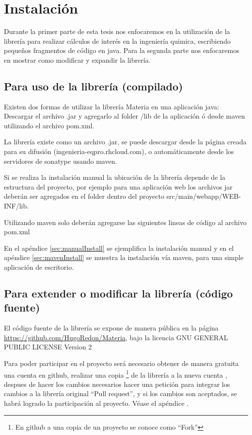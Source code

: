 \chapter{Instalación}

  Durante la primer parte de esta tesis nos enfocaremos en la utilización de la librería para realizar cálculos de interés en la ingeniería quimica, escribiendo pequeños fragmentos de código en java. Para la segunda parte nos enfocaremos en mostrar como modificar y expandir la librería.

  \section{Para uso de la librería (compilado)}

      Existen dos formas de utilizar la librería Materia en una aplicación java:
    Descargar el archivo .jar y agregarlo al folder /lib de la aplicación ó desde maven utilizando el archivo pom.xml.

    La librería existe como un archivo .jar, se puede descargar desde la página creada para su difusión (ingenieria-eqpro.rhcloud.com), o automáticamente desde los servidores de sonatype usando maven.

    Si se realiza la instalación manual la ubicación de la librería depende de la estructura del proyecto, por ejemplo para una aplicación web los archivos jar deberán ser agregados en el folder dentro del proyecto src/main/webapp/WEB-INF/lib.

    Utilizando maven solo deberán agregarse las siguientes lineas de código al archivo pom.xml

    

    En el apéndice \ref{sec:manualInstall} se ejemplifica la instalación manual y en el apéndice \ref{sec:mavenInstall} se muestra la instalación vía maven, para una simple aplicación de escritorio.


  \section{Para extender o modificar la librería (código fuente)}

    El código fuente de la librería se expone de manera pública en la página \url{https://github.com/HugoRedon/Materia}, bajo la licencia GNU GENERAL PUBLIC LICENSE Version 2
  
    Para poder participar en el proyecto será necesario obtener de manera gratuita una cuenta en github, realizar una copia \footnote{En github a una copia de un proyecto se conoce como ``Fork''} de la librería  a la nueva cuenta , despues de hacer los cambios necesarios hacer una petición para integrar los cambios a la librería original ``Pull request'', y si los cambios son aceptados, se habrá logrado la participación al proyecto. Véase el apéndice .




